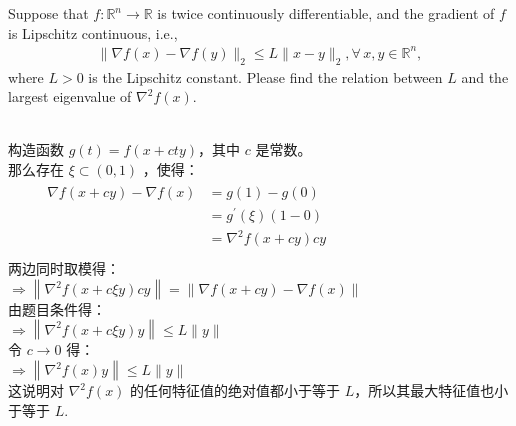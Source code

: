\documentclass[11pt,letter,notitlepage]{article}
\begin{document}
\begin{exercise}
Suppose that $f:\mathbb{R}^n\rightarrow\mathbb{R}$ is twice continuously differentiable, and the gradient of $f$ is Lipschitz continuous, i.e.,
\begin{align*}
    \|\nabla f(x)-\nabla f(y)\|_2\le L\|x-y\|_2, \forall\,x,y\in\mathbb{R}^n,
\end{align*}
where $L>0$ is the Lipschitz constant. Please find the relation between $L$ and the largest eigenvalue of $\nabla^2 f(x)$.
\end{exercise}
\begin{solution}
    \heiti \ \\
    构造函数 $g(t)= f(x+c t y)$，其中 $c$ 是常数。\\
    那么存在 $\xi \subset (0,1)$ ，使得：\\
    $\begin{array}{l}{\qquad \begin{aligned}  \nabla f(x+c y)-\nabla f(x) &=g(1)-g(0) \\ &=g^{\prime}\left(\xi \right)(1-0) \\ &=\nabla^{2} f(x+c y)c y \end{aligned}} \\  \end{array}$\\
    两边同时取模得：\\
    $ \Rightarrow \left\|\nabla^{2} f(x+c \xi y) c y\right\|=\|\nabla f(x+c y)-\nabla f(x)\|$\\
    由题目条件得：\\
    ${\Rightarrow\left\|\nabla^{2} f(x+c \xi y) y\right\| \leqslant L\|y\|}$\\
    令 ${c \rightarrow 0}$ 得：\\
    ${\Rightarrow\left\|\nabla^{2} f(x) y\right\| \leqslant L\|y\|}$\\
    这说明对 $\nabla^{2}f(x)$ 的任何特征值的绝对值都小于等于 $L$，所以其最大特征值也小于等于 $L$.
\end{solution}
\newpage
\end{document}
